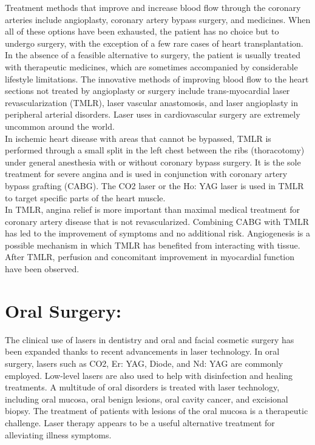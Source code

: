 \documentclass[12pt]{article}
\begin{document}
\hspace{2.5cm} Treatment methods that improve and increase blood flow through the coronary arteries include angioplasty, coronary artery bypass surgery, and medicines. When all of these options have been exhausted, the patient has no choice but to undergo surgery, with the exception of a few rare cases of heart transplantation. In the absence of a feasible alternative to surgery, the patient is usually treated with therapeutic medicines, which are sometimes accompanied by considerable lifestyle limitations. The innovative methods of improving blood flow to the heart sections not treated by angioplasty or surgery include trans-myocardial laser revascularization (TMLR), laser vascular anastomosis, and laser angioplasty in peripheral arterial disorders. Laser uses in cardiovascular surgery are extremely uncommon around the world. \\
\indent
\hspace{2cm} In ischemic heart disease with areas that cannot be bypassed, TMLR is performed through a small split in the left chest between the ribs (thoracotomy) under general anesthesia with or without coronary bypass surgery. It is the sole treatment for severe angina and is used in conjunction with coronary artery bypass grafting (CABG). The CO2 laser or the Ho: YAG laser is used in TMLR to target specific parts of the heart muscle.\\
\indent
\hspace{2cm} In TMLR, angina relief is more important than maximal medical treatment for coronary artery disease that is not revascularized. Combining CABG with TMLR has led to the improvement of symptoms and no additional risk. Angiogenesis is a possible mechanism in which TMLR has benefited from interacting with tissue. After TMLR, perfusion and concomitant improvement in myocardial function have been observed.\\

\section{Oral Surgery:}

\hspace{2.5cm} The clinical use of lasers in dentistry and oral and facial cosmetic surgery has been expanded thanks to recent advancements in laser technology. In oral surgery, lasers such as CO2, Er: YAG, Diode, and Nd: YAG are commonly employed. Low-level lasers are also used to help with disinfection and healing treatments. A multitude of oral disorders is treated with laser technology, including oral mucosa, oral benign lesions, oral cavity cancer, and excisional biopsy. The treatment of patients with lesions of the oral mucosa is a therapeutic challenge. Laser therapy appears to be a useful alternative treatment for alleviating illness symptoms.\\
\end{document}
